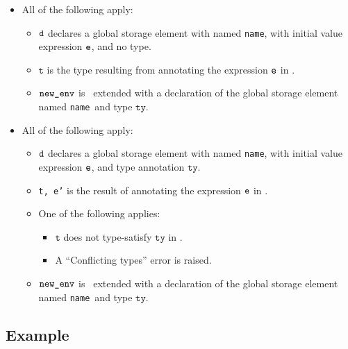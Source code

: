 \documentclass{book}
\newcommand\vt[0]{\texttt{t}}
\newcommand\tty[0]{\texttt{ty}}
\newcommand\name[0]{\texttt{name}}
\begin{document}
\begin{itemize}
  \item All of the following apply:
  \begin{itemize}
    \item $\texttt{d}$ declares a global storage element with named \name, with initial value expression $\texttt{e}$, and no type.
    \item $\vt$ is the type resulting from annotating the expression $\texttt{e}$ in \tenv.
    \item $\texttt{new\_env}$ is \tenv\ extended with a declaration of the global storage element named \name\ and type $\tty$.
  \end{itemize}

  \item All of the following apply:
  \begin{itemize}
    \item $\texttt{d}$ declares a global storage element with named \name, with initial value expression $\texttt{e}$, and type annotation $\tty$.
    \item \texttt{t, e'} is the result of annotating the expression $\texttt{e}$ in \tenv.
    \item One of the following applies:
    \begin{itemize}
      \item $\vt$ does not type-satisfy $\tty$ in \tenv.
      \item A ``Conflicting types'' error is raised.
    \end{itemize}
    \item $\texttt{new\_env}$ is \tenv\ extended with a declaration of the global storage element named \name\ and type $\tty$.
  \end{itemize}
\end{itemize}

\subsection{Example}
\end{document}
